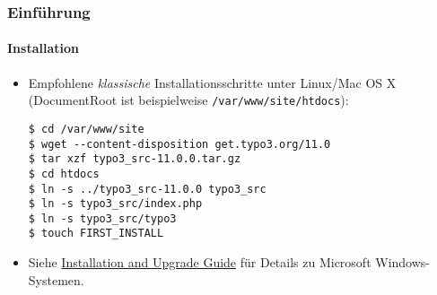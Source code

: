 %

\begin{frame}[fragile]
	\frametitle{Einführung}
	\framesubtitle{Installation}


	\begin{itemize}
		\item Empfohlene \textit{klassische} Installationsschritte unter Linux/Mac OS X\newline
			(DocumentRoot ist beispielweise \texttt{/var/www/site/htdocs}):
\begin{lstlisting}
$ cd /var/www/site
$ wget --content-disposition get.typo3.org/11.0
$ tar xzf typo3_src-11.0.0.tar.gz
$ cd htdocs
$ ln -s ../typo3_src-11.0.0 typo3_src
$ ln -s typo3_src/index.php
$ ln -s typo3_src/typo3
$ touch FIRST_INSTALL
\end{lstlisting}

		\item Siehe \href{https://docs.typo3.org/m/typo3/guide-installation/master/en-us/}{Installation and Upgrade Guide}
			für Details zu Microsoft Windows-Systemen.

	\end{itemize}
\end{frame}

